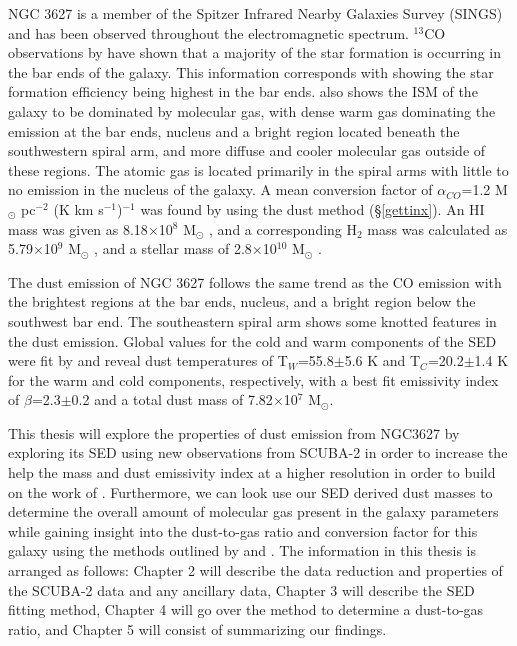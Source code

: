 NGC 3627 is a member of the Spitzer Infrared Nearby Galaxies Survey (SINGS) \citep{kennicutt2003} and has been observed throughout the electromagnetic spectrum.  $^{13}$CO observations by \cite{watanabe2011} have shown that a majority of the star formation is occurring in the bar ends of the galaxy.  This information corresponds with \cite{warren2010} showing the star formation efficiency being highest in the bar ends.  \cite{warren2010} also shows the ISM of the galaxy to be dominated by molecular gas, with dense warm gas dominating the emission at the bar ends, nucleus and a bright region located beneath the southwestern spiral arm, and more diffuse and cooler molecular gas outside of these regions.  The atomic gas is located primarily in the spiral arms with little to no emission in the nucleus of the galaxy.  A mean conversion factor of $\alpha_{CO}$=1.2 M$_\odot$ pc$^{-2}$ (K km s$^{-1}$)$^{-1}$ was found by \cite{sandstrom2013} using the dust method (\S\ref{gettinx}).  An HI mass was given as 8.18$\times$10$^8$ M$_\odot$ \citep{walter2008}, and a corresponding H$_2$ mass was calculated as 5.79$\times$10$^9$ M$_\odot$ \citep{kennicutt2003}, and a stellar mass of 2.8$\times$10$^{10}$ M$_\odot$ \citep{skibba2011}.

The dust emission of NGC 3627 follows the same trend as the CO emission with the brightest regions at the bar ends, nucleus, and a bright region below the southwest bar end.  The southeastern spiral arm shows some knotted features in the dust emission.  Global values for the cold and warm components of the SED were fit by \cite{galametz2012} and reveal dust temperatures of T$_W$=55.8$\pm$5.6 K and T$_C$=20.2$\pm$1.4 K for the warm and cold components, respectively, with a best fit emissivity index of $\beta$=2.3$\pm$0.2 and a total dust mass of 7.82$\times$10$^7$ M$_\odot$.

This thesis will explore the properties of dust emission from NGC3627 by exploring its SED using new observations from SCUBA-2 in order to increase the help the mass and dust emissivity index at a higher resolution in order to build on the work of \cite{galametz2012}.  Furthermore, we can look use our SED derived dust masses to determine the overall amount of molecular gas present in the galaxy parameters while gaining insight into the dust-to-gas ratio and conversion factor for this galaxy using the methods outlined by \cite{leroy2009} and \cite{sandstrom2013}.  The information in this thesis is arranged as follows: Chapter 2 will describe the data reduction and properties of the SCUBA-2 data and any ancillary data, Chapter 3 will describe the SED fitting method, Chapter 4 will go over the method to determine a dust-to-gas ratio, and Chapter 5 will consist of summarizing our findings.

